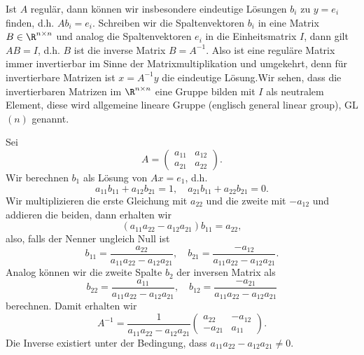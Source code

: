 \documentclass[letterpaper,10pt,english]{jupyterBook}
\begin{document}
Ist \(A\) regulär, dann können wir insbesondere eindeutige Lösungen \(b_i\) zu \(y=e_i\) finden, d.h. \(A b_i = e_i\). Schreiben wir die Spaltenvektoren \(b_i\) in eine Matrix \(B \in \R^{n \times n}\) und analog die Spaltenvektoren \(e_i\) in die Einheitsmatrix \(I\), dann gilt \(AB=I\), d.h. \(B\) ist die inverse Matrix \(B=A^{-1}\). Also ist eine reguläre Matrix immer invertierbar im Sinne der Matrixmultiplikation und umgekehrt, denn für invertierbare Matrizen ist \(x=A^{-1}y\) die eindeutige Lösung.Wir sehen, dass die invertierbaren Matrizen im \(\R^{n \times n}\) eine Gruppe bilden mit \(I\) als neutralem Element, diese wird allgemeine lineare Gruppe (englisch general linear group), GL\((n)\) genannt.
\label{vektorraeume/LGS:example-9}
\begin{example}{}{}



Sei
\begin{equation*}
 A = \left( \begin{matrix} a_{11} & a_{12} \\ a_{21} & a_{22}  \end{matrix} \right).
\end{equation*}
Wir berechnen \(b_1\) als Lösung von \(Ax = e_1\), d.h.
\begin{equation*}
 a_{11} b_{11} + a_{12} b_{21} = 1, \quad a_{21} b_{11} + a_{22} b_{21} = 0.
\end{equation*}
Wir multiplizieren die erste Gleichung mit \(a_{22}\) und die zweite mit \(-a_{12}\) und addieren die beiden, dann erhalten wir
\begin{equation*}
 (a_{11} a_{22} - a_{12} a_{21}) b_{11} = a_{22},
\end{equation*}
also, falls der Nenner ungleich Null ist
\begin{equation*}
 b_{11} = \frac{a_{22}}{a_{11} a_{22} - a_{12} a_{21}}, \quad b_{21} = \frac{-a_{12}}{a_{11} a_{22} - a_{12} a_{21}}.
\end{equation*}
Analog können wir die zweite Spalte \(b_2\) der inversen Matrix als
\begin{equation*}
 b_{22} = \frac{a_{11}}{a_{11} a_{22} - a_{12} a_{21}}, \quad b_{12} = \frac{-a_{21}}{a_{11} a_{22} - a_{12} a_{21}}\end{equation*}
berechnen. Damit erhalten wir
\begin{equation*}
 A^{-1} = \frac{1}{a_{11} a_{22} - a_{12} a_{21}} \left( \begin{matrix} a_{22} & -a_{12} \\ - a_{21} & a_{11}  \end{matrix} \right).
\end{equation*}
Die Inverse existiert unter der Bedingung, dass \(a_{11} a_{22} - a_{12} a_{21} \neq 0\).
\end{example}
\end{document}
